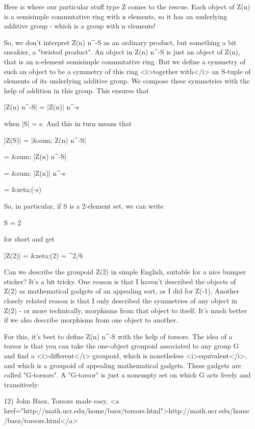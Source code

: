 Here is where our particular stuff type Z comes to the rescue.  Each
object of Z(n) is a semisimple commutative ring with n elements, so it
has an underlying additive group - which is a group with n elements!

So, we don't interpret Z(n) \times  n^{-S} as an ordinary
product, but something a bit sneakier, a "twisted product".  An object
in Z(n) \times  n^{-S} is just an object of Z(n), that is an
n-element semisimple commutative ring.  But we define a symmetry of
such an object to be a symmetry of this ring <i>together with</i> an
S-tuple of elements of its underlying additive group.  We compose
these symmetries with the help of addition in this group.  This
ensures that

|Z(n) \times  n^{-S}| = |Z(n)| \times  n^{-s}

when |S| = s.  And this in turn means that

|Z(S)| = |&sum; Z(n) \times  n^{-S}|

= &sum; |Z(n) \times  n^{-S}|

= &sum; |Z(n)| \times  n^{-s}

= &zeta;(-s)

So, in particular, if S is a 2-element set, we can write

S = 2 

for short and get

|Z(2)| = &zeta;(2) = \pi ^{2}/6

Can we describe the groupoid Z(2) in simple English, suitable for a
nice bumper sticker?  It's a bit tricky.  One reason is that I haven't
described the objects of Z(2) as mathematical gadgets of an appealing
sort, as I did for Z(-1).  Another closely related reason is that I
only described the symmetries of any object in Z(2) - or more
technically, morphisms from that object to itself.  It's much better
if we also describe morphisms from one object to another.

For this, it's best to define Z(n) \times  n^{-S} with the
help of torsors.  The idea of a torsor is that you can take the
one-object groupoid associated to any group G and find a
<i>different</i> groupoid, which is nonetheless <i>equivalent</i>, and
which is a groupoid of appealing mathematical gadgets.  These gadgets
are called "G-torsors".  A "G-torsor" is just a nonempty set on which
G acts freely and transitively:

12) John Baez, Torsors made easy, <a href="http://math.ucr.edu/home/baez/torsors.html">http://math.ucr.edu/home/baez/torsors.html</a>

